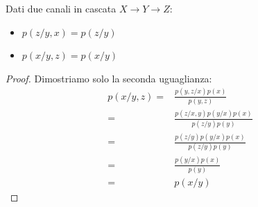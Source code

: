 \bigskip



\begin{lemma}
\mbox{}

Dati due canali in cascata $X \to Y \to Z$:
 \begin{itemize}
  \item $p(z/y,x)=p(z/y)$
  \item $p(x/y,z)=p(x/y)$
 \end{itemize}
 \begin{proof}
  Dimostriamo solo la seconda uguaglianza:
  \[\begin{split}
   p(x/y,z)=& \frac{p(y,z/x)p(x)}{p(y,z)} \\
   =&\frac{p(z/x,y)p(y/x)p(x)}{p(z/y)p(y)} \\
   =&\frac{p(z/y)p(y/x)p(x)}{p(z/y)p(y)} \\
   =&\frac{p(y/x)p(x)}{p(y)} \\
   =&p(x/y)
    \end{split}
  \]

 \end{proof}
\label{lem:cascata}
\end{lemma}

